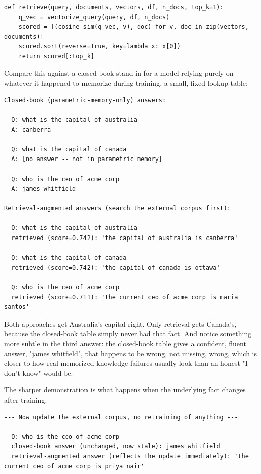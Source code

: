 \begin{Verbatim}[fontsize=\small, frame=single, xleftmargin=1em, xrightmargin=1em]
def retrieve(query, documents, vectors, df, n_docs, top_k=1):
    q_vec = vectorize_query(query, df, n_docs)
    scored = [(cosine_sim(q_vec, v), doc) for v, doc in zip(vectors, documents)]
    scored.sort(reverse=True, key=lambda x: x[0])
    return scored[:top_k]
\end{Verbatim}

Compare this against a closed-book stand-in for a model relying purely on whatever it happened to memorize during training, a small, fixed lookup table:

\begin{Verbatim}[fontsize=\small, frame=single, xleftmargin=1em, xrightmargin=1em]
Closed-book (parametric-memory-only) answers:

  Q: what is the capital of australia
  A: canberra

  Q: what is the capital of canada
  A: [no answer -- not in parametric memory]

  Q: who is the ceo of acme corp
  A: james whitfield

Retrieval-augmented answers (search the external corpus first):

  Q: what is the capital of australia
  retrieved (score=0.742): 'the capital of australia is canberra'

  Q: what is the capital of canada
  retrieved (score=0.742): 'the capital of canada is ottawa'

  Q: who is the ceo of acme corp
  retrieved (score=0.711): 'the current ceo of acme corp is maria santos'
\end{Verbatim}

Both approaches get Australia's capital right. Only retrieval gets Canada's, because the closed-book table simply never had that fact. And notice something more subtle in the third answer: the closed-book table gives a confident, fluent answer, "james whitfield", that happens to be wrong, not missing, wrong, which is closer to how real memorized-knowledge failures usually look than an honest "I don't know" would be.

The sharper demonstration is what happens when the underlying fact changes after training:

\begin{Verbatim}[fontsize=\small, frame=single, xleftmargin=1em, xrightmargin=1em]
--- Now update the external corpus, no retraining of anything ---

  Q: who is the ceo of acme corp
  closed-book answer (unchanged, now stale): james whitfield
  retrieval-augmented answer (reflects the update immediately): 'the current ceo of acme corp is priya nair'
\end{Verbatim}

